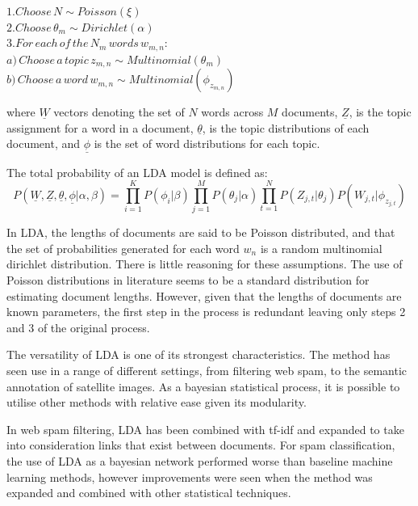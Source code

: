 \documentclass[10pt]{report}
\begin{document}
\renewcommand{\baselinestretch}{1.0}\normalsize
\(1. Choose\, N \sim Poisson(\xi)\)\\
\(2. Choose\, \theta_m \sim Dirichlet(\alpha)\)\\
\(3. For\, each\, of\, the\, N_m\, words\, w_{m,n}:\)\\
{\hspace*{15mm} \(a)\, Choose\, a\, topic\, z_{m,n} \sim Multinomial(\theta_m)  \)}\\
{\hspace*{15mm} \(b)\, Choose\, a\, word\, w_{m,n} \sim Multinomial(\phi_{z_{m,n}}) \)}

\renewcommand{\baselinestretch}{2.0}\normalsize
where $\underline{W}$ vectors denoting the set of $N$ words across $M$ documents, $\underline{Z}$, is the topic assignment for a word in a document, $\underline{\theta}$, is the topic distributions of each document, and $\underline{\phi}$ is the set of word distributions for each topic.

\renewcommand{\baselinestretch}{1.0}\normalsize
The total probability of an LDA model is defined as:
\[
  P(\underline{W},\underline{Z},\underline{\theta},\underline{\phi}|\alpha,\beta) = \prod^{K}_{i=1} P(\phi_i|\beta) \prod^{M}_{j=1} P(\theta_j|\alpha)\prod^{N}_{t=1} P(Z_{j,t} | \theta_j)P(W_{j,t} | \phi_{z_{j,t}})
\]
\renewcommand{\baselinestretch}{2.0}\normalsize

In LDA, the lengths of documents are said to be Poisson distributed, and that the set of probabilities  generated for each word \(w_n\) is a random multinomial dirichlet distribution. There is little reasoning for these assumptions. The use of Poisson distributions in literature seems to be a standard distribution for estimating document lengths. However, given that the lengths of documents are known parameters, the first step in the process is redundant leaving only steps 2 and 3 of the original process.

The versatility of LDA is one of its strongest characteristics. The method has seen use in a range of different settings, from filtering web spam, to the semantic annotation of satellite images. As a bayesian statistical process, it is possible to utilise other methods with relative ease given its modularity.

In web spam filtering, LDA has been combined with tf-idf and expanded to take into consideration links that exist between documents. For spam classification, the use of LDA as a bayesian network performed worse than baseline machine learning methods, however improvements were seen when the method was expanded and combined with other statistical techniques.~\cite{Biro2008-ld}
\end{document}
